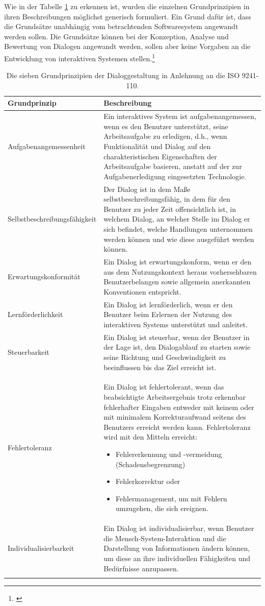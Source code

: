 Wie in der Tabelle \ref{tab:siebenGrundprinzipien} zu erkennen ist, wurden die einzelnen Grundprinzipien in ihren Beschreibungen möglichst generisch formuliert. Ein Grund dafür ist, dass die Grundsätze unabhängig vom betrachtenden Softwaresystem angewandt werden sollen. Die Grundsätze können bei der Konzeption, Analyse und Bewertung von Dialogen angewandt werden, sollen aber keine Vorgaben an die Entwicklung von interaktiven Systemen stellen.\footnote{\cite[vgl.][Kap. 4.1]{ISO9241-110}}
\pagebreak
\begin{center}
\begin{longtable}{|p{5.1cm}|p{9.5cm}|} 
\hline
\textbf{Grundprinzip} & \textbf{Beschreibung} \\ \hline
Aufgabenangemessenheit & Ein interaktives System ist aufgabenangemessen, wenn es den Benutzer unterstützt, seine Arbeitsaufgabe zu erledigen, d.h., wenn Funktionalität und Dialog auf den charakteristischen Eigenschaften der Arbeitsaufgabe basieren, anstatt auf der zur Aufgabenerledigung eingesetzten Technologie. \\ \hline
Selbstbeschreibungsfähigkeit & Der Dialog ist in dem Maße selbstbeschreibungsfähig, in dem für den Benutzer zu jeder Zeit offensichtlich ist, in welchem Dialog, an welcher Stelle im Dialog er sich befindet, welche Handlungen unternommen werden können und wie diese ausgeführt werden können. \\ \hline
Erwartungskonformität & Ein Dialog ist erwartungskonform, wenn er den aus dem Nutzungskontext heraus vorhersehbaren Benutzerbelangen sowie allgemein anerkannten Konventionen entspricht. \\ \hline
Lernförderlichkeit & Ein Dialog ist lernförderlich, wenn er den Benutzer beim Erlernen der Nutzung des interaktiven Systems unterstützt und anleitet. \\ \hline
Steuerbarkeit & Ein Dialog ist steuerbar, wenn der Benutzer in der Lage ist, den Dialogablauf zu starten sowie seine Richtung und Geschwindigkeit zu beeinflussen bis das Ziel erreicht ist. \\ \hline
Fehlertoleranz & Ein Dialog ist fehlertolerant, wenn das beabsichtigte Arbeitsergebnis trotz erkennbar fehlerhafter Eingaben entweder mit keinem oder mit minimalem Korrekturaufwand seitens des Benutzers erreicht werden kann. Fehlertoleranz wird mit den Mitteln erreicht: 
\begin{itemize}\itemsep0pt
  \item Fehlererkennung und -vermeidung (Schadensbegrenzung)
  \item Fehlerkorrektur oder
  \item Fehlermanagement, um mit Fehlern umzugehen, die sich ereignen.
\end{itemize} \\ \hline
Individualisierbarkeit & Ein Dialog ist individualisierbar, wenn Benutzer die Mensch-System-Interaktion und die Darstellung von Informationen ändern können, um diese an ihre individuellen Fähigkeiten und Bedürfnisse anzupassen.\\ \hline
\caption{Die sieben Grundprinzipien der Dialoggestaltung in Anlehnung an die ISO 9241-110.}
\label{tab:siebenGrundprinzipien}
\end{longtable}
\end{center}
